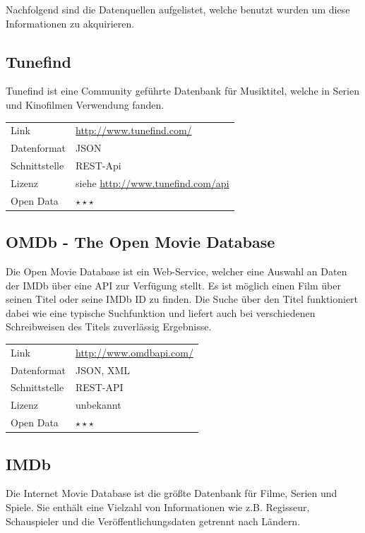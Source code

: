 \documentclass[parskip]{scrartcl}
\begin{document}
Nachfolgend sind die Datenquellen aufgelistet, welche benutzt wurden um diese Informationen zu akquirieren.

\subsection{Tunefind}
\label{subsec:tunefind}

Tunefind ist eine Community geführte Datenbank für Musiktitel, welche in Serien und Kinofilmen Verwendung fanden.

\begin{tabular}{l|p{9cm}}
	Link & \url{http://www.tunefind.com/} \\
 	Datenformat & JSON \\
 	Schnittstelle & REST-Api \\
 	Lizenz & siehe \url{http://www.tunefind.com/api} \\
 	Open Data & $\star\star\star$ \\
\end{tabular}

\subsection{OMDb - The Open Movie Database}

Die Open Movie Database ist ein Web-Service, welcher eine Auswahl an Daten der IMDb über eine API zur Verfügung stellt. Es ist möglich einen Film über seinen  Titel oder seine IMDb ID zu finden. Die Suche über den Titel funktioniert dabei wie eine typische Suchfunktion und liefert auch bei verschiedenen Schreibweisen des Titels zuverlässig Ergebnisse.

\begin{tabular}{l|p{9cm}}
    Link & \url{http://www.omdbapi.com/} \\
    Datenformat & JSON, XML \\
    Schnittstelle & REST-API \\
    Lizenz & unbekannt \\
    Open Data & $\star\star\star$ \\
\end{tabular}

\subsection{IMDb}

Die Internet Movie Database ist die größte Datenbank für Filme, Serien und Spiele. Sie enthält eine Vielzahl von Informationen wie z.B. Regisseur, Schauspieler und die Veröffentlichungsdaten getrennt nach Ländern.
\end{document}
